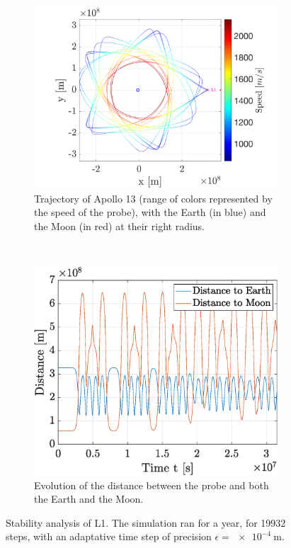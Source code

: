 \documentclass[a4paper,12pt,twoside]{article}
\begin{document}
\begin{figure}[h]
  \centering
  \begin{subfigure}[t]{0.55\textwidth}
    \includegraphics[width=\textwidth]{graphs/ex7b_L1_traj.png}
    \caption{Trajectory of Apollo 13 (range of colors represented by the speed of the probe), with the Earth (in blue) and the Moon (in red) at their right radius.}
    \label{fig:7b_L1_traj}
  \end{subfigure}
  ~
  \begin{subfigure}[t]{0.4\textwidth}
    \includegraphics[width=\textwidth]{graphs/ex7b_L1_dist.eps}
    \caption{Evolution of the distance between the probe and both the Earth and the Moon.}
    \label{fig:7b_L1_dist}
  \end{subfigure}
  \caption{Stability analysis of L1. The simulation ran for a year, for \num{19932} steps, with an adaptative time step of precision $\epsilon = \SI{e-4}{\m}$.}
  \label{fig:7b_L1}
\end{figure}
\end{document}
